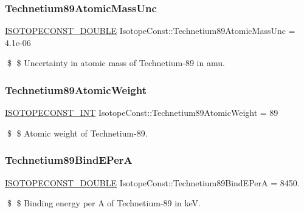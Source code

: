 \subsubsection{\texorpdfstring{Technetium89\+Atomic\+Mass\+Unc}{Technetium89AtomicMassUnc}}
{\footnotesize\ttfamily \mbox{\hyperlink{group___isotope_const-_macros_ga8f45a7272ce02c0b4c65c44636ed719a}{I\+S\+O\+T\+O\+P\+E\+C\+O\+N\+S\+T\+\_\+\+D\+O\+U\+B\+LE}} Isotope\+Const\+::\+Technetium89\+Atomic\+Mass\+Unc = 4.\+1e-\/06}

\$ \$ Uncertainty in atomic mass of Technetium-\/89 in amu. \mbox{\label{group___isotope_const-_technetium-_tc89_ga0849b4c5f7a0f1ef9ab8a7e21edd4446}} 
\subsubsection{\texorpdfstring{Technetium89\+Atomic\+Weight}{Technetium89AtomicWeight}}
{\footnotesize\ttfamily \mbox{\hyperlink{group___isotope_const-_macros_ga5f18360b3e99483a35c32d789e62621c}{I\+S\+O\+T\+O\+P\+E\+C\+O\+N\+S\+T\+\_\+\+I\+NT}} Isotope\+Const\+::\+Technetium89\+Atomic\+Weight = 89}

\$ \$ Atomic weight of Technetium-\/89. \mbox{\label{group___isotope_const-_technetium-_tc89_ga5145600ec23a2892c899068725aff921}} 
\subsubsection{\texorpdfstring{Technetium89\+Bind\+E\+PerA}{Technetium89BindEPerA}}
{\footnotesize\ttfamily \mbox{\hyperlink{group___isotope_const-_macros_ga8f45a7272ce02c0b4c65c44636ed719a}{I\+S\+O\+T\+O\+P\+E\+C\+O\+N\+S\+T\+\_\+\+D\+O\+U\+B\+LE}} Isotope\+Const\+::\+Technetium89\+Bind\+E\+PerA = 8450.}

\$ \$ Binding energy per A of Technetium-\/89 in keV. \mbox{\label{group___isotope_const-_technetium-_tc89_ga7666ecddd52bdf0ff2d2c93c3def1994}} 
